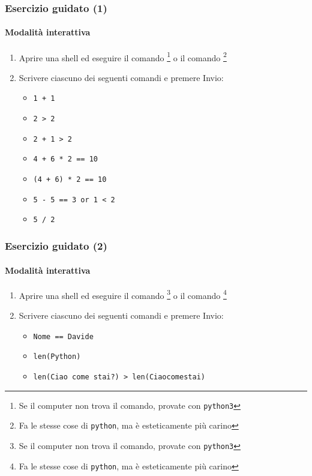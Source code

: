 \begin{exerciseframe}
    \frametitle{Esercizio guidato (1)}
    \framesubtitle{Modalità interattiva}

    \begin{enumerate}
        \item Aprire una shell ed eseguire il comando \footnote[frame]{Se il computer non trova il comando, provate con \texttt{python3}} o il comando \footnote[frame]{Fa le stesse cose di \texttt{python}, ma è esteticamente più carino}
        \item Scrivere ciascuno dei seguenti comandi e premere Invio:
            \begin{itemize}
                \item \texttt{1 + 1}
                \pause
                \item \texttt{2 > 2}
                \pause
                \item \texttt{2 + 1 > 2}
                \item \texttt{4 + 6 * 2 == 10}
                \item \texttt{(4 + 6) * 2 == 10}
                \item \texttt{5 - 5 == 3 or 1 < 2}
                \item \texttt{5 / 2}
            \end{itemize}
    \end{enumerate}
\end{exerciseframe}

\begin{exerciseframe}
    \frametitle{Esercizio guidato (2)}
    \framesubtitle{Modalità interattiva}

    \begin{enumerate}
        \item Aprire una shell ed eseguire il comando \footnote[frame]{Se il computer non trova il comando, provate con \texttt{python3}} o il comando \footnote[frame]{Fa le stesse cose di \texttt{python}, ma è esteticamente più carino}
        \item Scrivere ciascuno dei seguenti comandi e premere Invio:
            \begin{itemize}
                \item \texttt{\textquotesingle{}Nome\textquotesingle{} == \textquotesingle{}Davide\textquotesingle{}}
                \item \texttt{len(\textquotesingle{}Python\textquotesingle{})}
                \item \texttt{len(\textquotesingle{}Ciao come stai?\textquotesingle{}) > len(\textquotesingle{}Ciaocomestai\textquotesingle{})}
            \end{itemize}
    \end{enumerate}
\end{exerciseframe}


